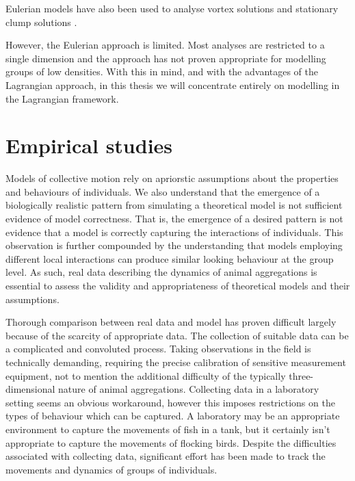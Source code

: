 Eulerian models have also been used to analyse vortex solutions \citep{topaz04} and stationary clump solutions \citep{topaz06}.

However, the Eulerian approach is limited. Most analyses are restricted to a single dimension and the approach has not proven appropriate for modelling groups of low densities. With this in mind, and with the advantages of the Lagrangian approach, in this thesis we will concentrate entirely on modelling in the Lagrangian framework.

\section{Empirical studies}
\label{sec:empirical_studies}

Models of collective motion rely on apriorstic assumptions about the properties and behaviours of individuals. We also understand that the emergence of a biologically realistic pattern from simulating a theoretical model is not sufficient evidence of model correctness. That is, the emergence of a desired pattern is not evidence that a model is correctly capturing the interactions of individuals. This observation is further compounded by the understanding that models employing different local interactions can produce similar looking behaviour at the group level. As such, real data describing the dynamics of animal aggregations is essential to assess the validity and appropriateness of theoretical models and their assumptions.

Thorough comparison between real data and model has proven difficult largely because of the scarcity of appropriate data. The collection of suitable data can be a complicated and convoluted process. Taking observations in the field is technically demanding, requiring the precise calibration of sensitive measurement equipment, not to mention the additional difficulty of the typically three-dimensional nature of animal aggregations. Collecting data in a laboratory setting seems an obvious workaround, however this imposes restrictions on the types of behaviour which can be captured. A laboratory may be an appropriate environment to capture the movements of fish in a tank, but it certainly isn't appropriate to capture the movements of flocking birds. Despite the difficulties associated with collecting data, significant effort has been made to track the movements and dynamics of groups of individuals.

